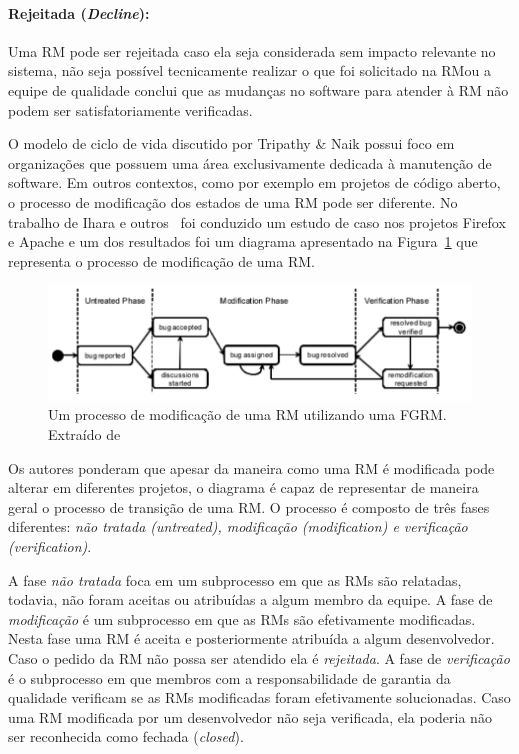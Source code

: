 \paragraph{Rejeitada (\textit{Decline}):}\label{par:rejeitada}

Uma RM pode ser rejeitada caso ela seja considerada sem impacto relevante no
sistema, não seja possível tecnicamente realizar o que foi solicitado na RM\@ ou
a equipe de qualidade conclui que as mudanças no software para atender à RM não
podem ser satisfatoriamente verificadas.

O modelo de ciclo de vida discutido por Tripathy \& Naik possui foco em
organizações que possuem uma área exclusivamente dedicada à manutenção de
software. Em outros contextos, como por exemplo em projetos de código aberto, o
processo de modificação dos estados de uma RM pode ser diferente. No trabalho de
Ihara e outros~\cite{ihara2009analysis} foi conduzido um estudo de caso nos
projetos Firefox e Apache e um dos resultados foi um diagrama apresentado na
Figura~\ref{fig:diagrama-estado-rm-codigo-aberto} que representa o processo de
modificação de uma RM\@.

\begin{figure}[htpb]
	\centering
    \includegraphics[width=0.8\linewidth]{./chapter-manutencao-software-visao-geral/img/diagrama-estado-rm-codigo-aberto.pdf}
    \caption{Um processo de modificação de uma RM utilizando uma FGRM\@.
        Extraído de~\cite{ihara2009analysis}}\label{fig:diagrama-estado-rm-codigo-aberto}
\end{figure}

Os autores ponderam que apesar da maneira como uma RM é modificada pode alterar
em diferentes projetos, o diagrama é capaz de representar de maneira geral o
processo de transição de uma RM\@. O processo é composto de três fases
diferentes: \textit{não tratada (untreated), modificação (modification) e
    verificação (verification)}.

A fase \textit{não tratada} foca em um subprocesso em que as RMs são relatadas,
todavia, não foram aceitas ou atribuídas a algum membro da equipe. A fase de
\textit{modificação} é um subprocesso em que as RMs são efetivamente
modificadas. Nesta fase uma RM é aceita e posteriormente atribuída a algum
desenvolvedor. Caso o pedido da RM não possa ser atendido ela é
\textit{rejeitada}. A fase de \textit{verificação} é o subprocesso em que
membros com a responsabilidade de garantia da qualidade verificam se as RMs
modificadas foram efetivamente solucionadas. Caso uma RM modificada por um
desenvolvedor não seja verificada, ela poderia não ser reconhecida como fechada
(\textit{closed}).

